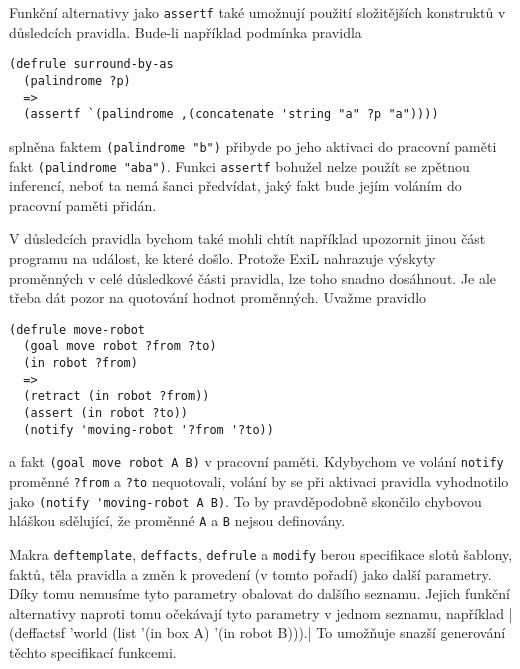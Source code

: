 Funkční alternativy jako \verb|assertf| také umožnují použití složitějších
konstruktů v důsledcích pravidla. Bude-li například podmínka pravidla
\begin{verbatim}
(defrule surround-by-as
  (palindrome ?p)
  =>
  (assertf `(palindrome ,(concatenate 'string "a" ?p "a"))))
\end{verbatim}
splněna faktem \verb|(palindrome "b")| přibyde po jeho aktivaci do pracovní
paměti fakt \verb|(palindrome "aba")|. Funkci \verb|assertf| bohužel nelze
použít se zpětnou inferencí, neboť ta nemá šanci předvídat, jaký fakt bude
jejím voláním do pracovní paměti přidán.

V důsledcích pravidla bychom také mohli chtít například upozornit jinou část
programu na událost, ke které došlo. Protože ExiL nahrazuje výskyty
proměnných v celé důsledkové části pravidla, lze toho snadno dosáhnout. Je ale
třeba dát pozor na quotování hodnot proměnných. Uvažme pravidlo
\begin{verbatim}
(defrule move-robot
  (goal move robot ?from ?to)
  (in robot ?from)
  =>
  (retract (in robot ?from))
  (assert (in robot ?to))
  (notify 'moving-robot '?from '?to))
\end{verbatim}
a fakt \verb|(goal move robot A B)| v pracovní paměti. Kdybychom ve volání
\verb|notify| proměnné \verb|?from| a \verb|?to| nequotovali, volání by se při
aktivaci pravidla vyhodnotilo jako \verb|(notify 'moving-robot A B)|. To by
pravděpodobně skončilo chybovou hláškou sdělující, že proměnné \verb|A| a
\verb|B| nejsou definovány.

Makra \verb|deftemplate|, \verb|deffacts|, \verb|defrule| a \verb|modify| berou
specifikace slotů šablony, faktů, těla pravidla a změn k provedení (v tomto
pořadí) jako další parametry. Díky tomu nemusíme tyto parametry obalovat do
dalšího seznamu. Jejich funkční alternativy naproti tomu očekávají tyto
parametry v jednom seznamu, například
\cl|(deffactsf 'world (list '(in box A) '(in robot B))).|
To umožňuje snazší generování těchto specifikací funkcemi.
